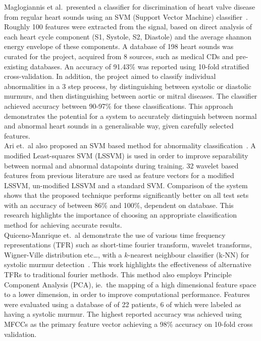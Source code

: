 \documentclass[titlepage, 12pt]{scrartcl} \usepackage{enumitem}
\begin{document}
Maglogiannis et al.\ presented a classifier for discrimination of heart valve
disease from regular heart sounds using an SVM (Support Vector Machine)
classifier~\parencite{Maglogiannis2009}.  Roughly 100 features were extracted
from the signal, based on direct analysis of each heart cycle component (S1,
Systole, S2, Diastole) and the average shannon energy envelope of these
components.  A database of 198 heart sounds was curated for the project,
acquired from 8 sources, such as medical CDs and pre-existing databases.  An
accuracy of 91.43\% was reported using 10-fold stratified cross-validation.  In
addition, the project aimed to classify individual abnormalities in a 3 step
process, by distinguishing between systolic or diastolic murmurs, and then
distinguishing between aortic or mitral diseases. The classifier achieved
accuracy between 90-97\% for these classifications. This approach demonstrates
the potential for a system to accurately distinguish between normal and
abnormal heart sounds in a generalisable way, given carefully selected
features.\\

Ari et.\ al also proposed an SVM based method for abnormality
classification~\parencite{Ari2010}. A modified Least-squares SVM (LSSVM) is
used in order to improve separability between normal and abnormal datapoints
during training. 32 wavelet based features from previous literature are used as
feature vectors for a modified LSSVM, un-modified LSSVM and a standard SVM.
Comparison of the system shows that the proposed technique performs
significantly better on all test sets with an accuracy of between 86\% and
100\%, dependent on database. This research highlights the importance of
choosing an appropriate classification method for achieving accurate results.\\

Quiceno-Manrique et.\ al demonstrate the use of various time frequency
representations (TFR) such as short-time fourier transform, wavelet transforms,
Wigner-Ville distribution etc\ldots, with a $k$-nearest neighbour classifier
(k-NN) for systolic murmur detection~\parencite{Quiceno-Manrique2010a}. This
work highlights the effectiveness of alternative TFRs to traditional fourier
methods. This method also employs Principle Component Analysis (PCA), ie.\ the
mapping of a high dimensional feature space to a lower dimension, in order to
improve computational performance. Features were evaluated using a database
of of 22 patients, 6 of which were labeled as having a systolic murmur. The
highest reported accuracy was achieved using MFCCs as the primary feature
vector achieving a 98\% accuracy on 10-fold cross validation.\\
\end{document}
